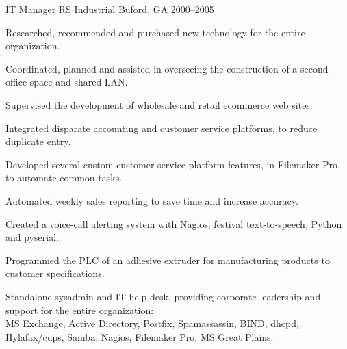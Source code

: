 \begin{cventries}
{\vspace*{3ex} %
}
  \cventry
    {IT Manager} %
    {RS Industrial} %
    {Buford, GA} %
    {2000--2005} %
    {
      \begin{cvitems} %
        \item {Researched, recommended and purchased new technology for the entire organization.}
        \item {Coordinated, planned and assisted in overseeing the construction of a second office space and shared LAN.}
        \item {Supervised the development of wholesale and retail ecommerce web sites.}
        \item {Integrated disparate accounting and customer service platforms, to reduce duplicate entry.}
        \item {Developed several custom customer service platform features, in Filemaker Pro, to automate common tasks.}
        \item {Automated weekly sales reporting to save time and increase accuracy.}
        \item {Created a voice-call alerting system with Nagios, festival text-to-speech, Python and pyserial.}
        \item {Programmed the PLC of an adhesive extruder for manufacturing products to customer specifications.}
      \end{cvitems}
    }
    {
      \begin{cventrysummary}
        Standalone sysadmin and IT help desk, providing corporate leadership and support for the entire organization: \\
        MS Exchange, Active Directory, Postfix, Spamassassin, BIND, dhcpd, Hylafax/cups, Samba, Nagios, Filemaker Pro, MS Great Plains.
      \end{cventrysummary}
    }

\end{cventries}
